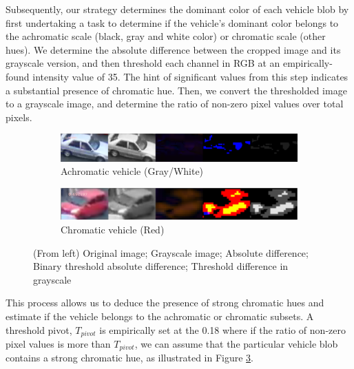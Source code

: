 \documentclass[runningheads]{llncs}
\newcommand{\ian}[1]{\textcolor{red}{#1}}
\newcommand{\ian}[1]{}   %
\begin{document}
Subsequently, our strategy determines the dominant color of each vehicle blob by first undertaking a task to determine if the vehicle's dominant color belongs to the achromatic scale (black, gray and white color) or chromatic scale (other hues). 
We determine the absolute difference between the cropped image and its grayscale version, and then %
threshold each channel in RGB at an empirically-found intensity value of 35. %
The hint of significant values from this step indicates a substantial presence of chromatic hue. Then, we convert the thresholded image to a grayscale image, and determine the ratio of non-zero pixel values over total pixels. 
\begin{figure}[t!]
\centering
\begin{subfigure}{\textwidth}
\includegraphics[width=\textwidth]{Images/achromatic_threshold5.PNG}
\caption{Achromatic vehicle (Gray/White)} \label{fig:achro_black}
\end{subfigure}
\begin{subfigure}{\textwidth}
\includegraphics[width=\textwidth]{Images/achromatic_threshold_color2.PNG}
\caption{Chromatic vehicle (Red)} \label{fig:achro_red}
\end{subfigure}
\caption{(From left) Original image; Grayscale image; Absolute difference; Binary threshold absolute difference; Threshold difference in grayscale} 
\label{fig:achromatic_thresh}
\vspace{-0.75em}
\end{figure}
This process allows us to deduce the presence of strong chromatic hues and estimate if the vehicle belongs to the achromatic or chromatic subsets. A threshold pivot, $T_{pivot}$ is empirically set at the 0.18 where if the ratio of non-zero pixel values is more than $T_{pivot}$,
we can assume that the particular vehicle blob contains a strong chromatic hue, as illustrated in Figure \ref{fig:achromatic_thresh}.
\end{document}
